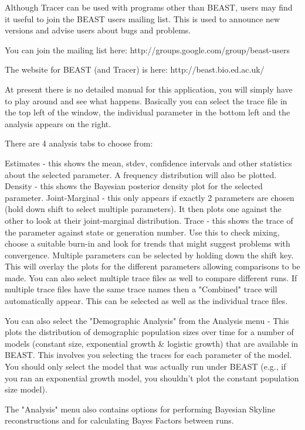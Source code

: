 \documentclass{bioinfo}
\begin{document}
Although Tracer can be used with programs other than BEAST, users may find it useful to join the BEAST users mailing list. This is used to announce new versions and advise users about bugs and problems.

You can join the mailing list here:
http://groups.google.com/group/beast-users

The website for BEAST (and Tracer) is here:
http://beast.bio.ed.ac.uk/

At present there is no detailed manual for this application, you will simply have to play around and see what happens. Basically you can select the trace file in the top left of the window, the individual parameter in the bottom left and the analysis appears on the right.

There are 4 analysis tabs to choose from:

Estimates - this shows the mean, stdev, confidence intervals and other statistics about the selected parameter. A frequency distribution will also be plotted.
Density - this shows the Bayesian posterior density plot for the selected parameter.
Joint-Marginal - this only appears if exactly 2 parameters are chosen (hold down shift to select multiple parameters). It then plots one against the other to look at their joint-marginal distribution.
Trace - this shows the trace of the parameter against state or generation number. Use this to check mixing, choose a suitable burn-in and look for trends that might suggest problems with convergence.
Multiple parameters can be selected by holding down the shift key. This will overlay the plots for the different parameters allowing comparisons to be made. You can also select multiple trace files as well to compare different runs. If multiple trace files have the same trace names then a "Combined" trace will automatically appear. This can be selected as well as the individual trace files.

You can also select the "Demographic Analysis" from the Analysis menu - This plots the distribution of demographic population sizes over time for a number of models (constant size, exponential growth \& logistic growth) that are available in BEAST. This involves you selecting the traces for each parameter of the model. You should only select the model that was actually run under BEAST (e.g., if you ran an exponential growth model, you shouldn't plot the constant population size model).

The "Analysis" menu also contains options for performing Bayesian Skyline reconstructions and for calculating Bayes Factors between runs.
\end{document}
